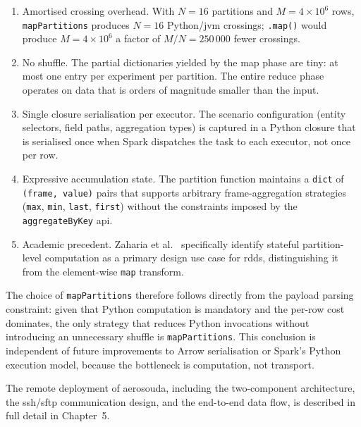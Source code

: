 \begin{enumerate}
    \item Amortised crossing overhead. With $N = 16$ partitions and $M = 4 \times 10^6$
          rows, \texttt{mapPartitions} produces $N = 16$ Python/\gls{jvm} crossings; \texttt{.map()}
          would produce $M = 4 \times 10^6$ a factor of $M/N = 250\,000$ fewer crossings.

    \item No shuffle. The partial dictionaries yielded by the map phase are tiny: at
          most one entry per experiment per partition.  The entire reduce phase operates on
          data that is orders of magnitude smaller than the input.

    \item Single closure serialisation per executor. The scenario configuration
          (entity selectors, field paths, aggregation types) is captured in a Python closure
          that is serialised once when Spark dispatches the task to each executor, not once
          per row.

    \item Expressive accumulation state. The partition function maintains a
          \texttt{dict} of \texttt{(frame, value)} pairs that supports arbitrary
          frame-aggregation strategies (\texttt{max}, \texttt{min}, \texttt{last},
          \texttt{first}) without the constraints imposed by the \texttt{aggregateByKey}
          \gls{api}.

    \item Academic precedent. Zaharia et al.\ \parencite{zaharia2012rdd} specifically
          identify stateful partition-level computation as a primary design use case for
          \glspl{rdd}, distinguishing it from the element-wise \texttt{map} transform.
\end{enumerate}

The choice of \texttt{mapPartitions} therefore follows directly from the payload parsing
constraint: given that Python computation is mandatory and the per-row cost dominates, the
only strategy that reduces Python invocations without introducing an unnecessary shuffle is
\texttt{mapPartitions}.  This conclusion is independent of future improvements to Arrow
serialisation or Spark's Python execution model, because the bottleneck is computation, not
transport.

The remote deployment of \gls{aerosouda}, including the two-component architecture,
the \gls{ssh}/\gls{sftp} communication design, and the end-to-end data flow, is
described in full detail in Chapter~5.
